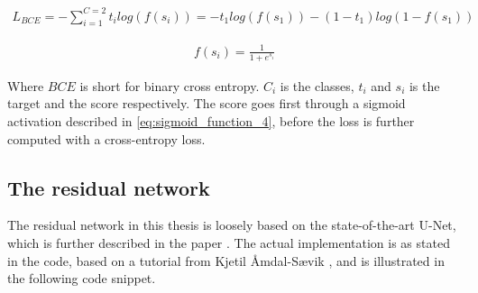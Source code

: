 \documentclass[USenglish]{ifimaster}  %
\begin{document}
\begin{equation}\label{eq:binary_cross_entropy}
\begin{aligned}
L_{BCE} = -\sum_{i=1}^{C=2}t_{i} log (f(s_{i})) = -t_{1} log(f(s_{1})) - (1 - t_{1}) log(1 - f(s_{1}))
\end{aligned}
\end{equation}

\begin{equation}\label{eq:sigmoid_function_4}
\begin{aligned}
f(s_i)= \frac{1}{1 + e^{s_i}}
\end{aligned}
\end{equation}

Where $BCE$ is short for binary cross entropy. $C_i$ is the classes, $t_i$ and $s_i$ is the target and the score respectively. The score goes first through a sigmoid activation described in \cref{eq:sigmoid_function_4}, before the loss is further computed with a cross-entropy loss.

\subsection{The residual network}\label{residual_network}
The residual network in this thesis is loosely based on the state-of-the-art U-Net, which is further described in the paper \cite{RFB15a_u-net}. The actual implementation is as stated in the code, based on a tutorial from Kjetil Åmdal-Sævik \cite{website:u-net_implementation}, and is illustrated in the following code snippet. 
\end{document}
